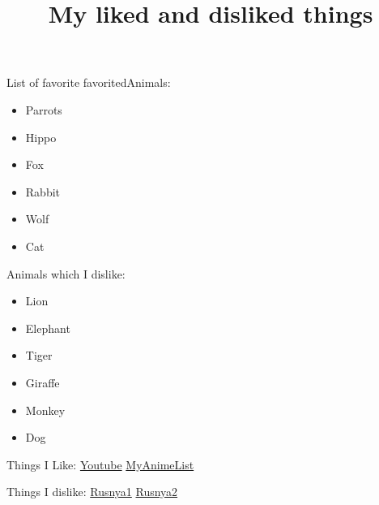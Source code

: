 \documentclass{article}
\begin{document}
\title{My liked and disliked things }
\maketitle
\par
List of favorite favoritedAnimals:
\begin{itemize}
\item Parrots
\item Hippo
\item Fox
\item Rabbit
\item Wolf
\item Cat
\end{itemize}
\par
\par
Animals which I dislike:
\begin{itemize}
\item Lion
\item Elephant
\item Tiger
\item Giraffe
\item Monkey
\item Dog
\end{itemize}
\par
\par
Things I Like:
\href{https://www.youtube.com/}{Youtube}
\href{https://myanimelist.net/}{MyAnimeList}
\par
Things I dislike:
\href{https://en.wikipedia.org/wiki/Russia}{Rusnya1}
\href{https://en.wikipedia.org/wiki/Russians}{Rusnya2}
\end{document}

